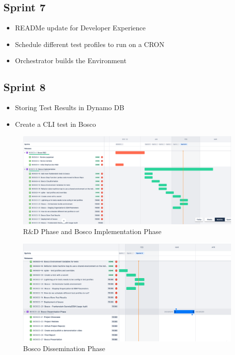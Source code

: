 \documentclass[12pt,a4paper,titlepage]{report}
\begin{document}
\subsection*{Sprint 7}
\begin{itemize}
\item READMe update for Developer Experience
\item Schedule different test profiles to run on a CRON
\item Orchestrator builds the Environment
\end{itemize}

\subsection*{Sprint 8}
\begin{itemize}
\item Storing Test Results in Dynamo DB
\item Create a CLI test in Bosco
\end{itemize}

\begin{figure}[ht]
 \centering
 \includegraphics[width=15cm]{./diagrams/sprints1.png}
 \caption{R\&D Phase and Bosco Implementation Phase}
\end{figure}

\begin{figure}[ht]
 \centering
 \includegraphics[width=15cm]{./diagrams/sprints2.png}
 \caption{Bosco Dissemination Phase}
\end{figure}
\end{document}
